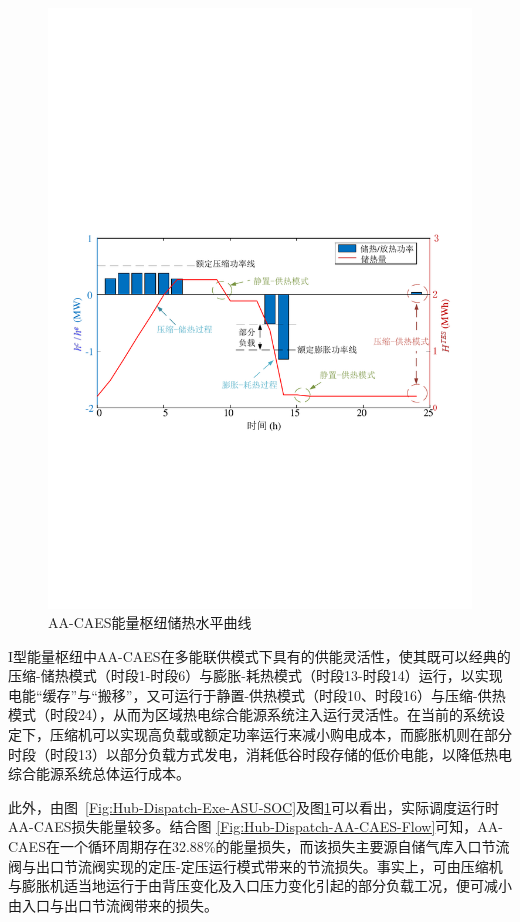 \begin{figure}[H]
\centering
\includegraphics[scale=0.65]{figures/Chap4-15-Hub-Dispatch-Exe-TES-SOC-V2.pdf}
\caption{AA-CAES能量枢纽储热水平曲线}
\label{Fig:Hub-Dispatch-Exe-TES-SOC}
\end{figure}

I型能量枢纽中AA-CAES在多能联供模式下具有的供能灵活性，使其既可以经典的压缩-储热模式（时段1-时段6）与膨胀-耗热模式（时段13-时段14）运行，以实现电能“缓存”与“搬移”，又可运行于静置-供热模式（时段10、时段16）与压缩-供热模式（时段24），从而为区域热电综合能源系统注入运行灵活性。在当前的系统设定下，压缩机可以实现高负载或额定功率运行来减小购电成本，而膨胀机则在部分时段（时段13）以部分负载方式发电，消耗低谷时段存储的低价电能，以降低热电综合能源系统总体运行成本。

此外，由图~\ref{Fig:Hub-Dispatch-Exe-ASU-SOC}及图\ref{Fig:Hub-Dispatch-Exe-TES-SOC}可以看出，实际调度运行时AA-CAES损失能量较多。结合图
\ref{Fig:Hub-Dispatch-AA-CAES-Flow}可知，AA-CAES在一个循环周期存在32.88\%的能量损失，而该损失主要源自储气库入口节流阀与出口节流阀实现的定压-定压运行模式带来的节流损失。事实上，可由压缩机与膨胀机适当地运行于由背压变化及入口压力变化引起的部分负载工况，便可减小由入口与出口节流阀带来的损失。

